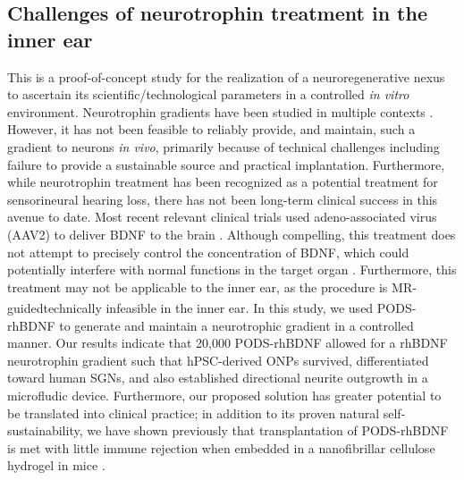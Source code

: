 \documentclass[review]{elsarticle}
\begin{document}
\subsection{Challenges of neurotrophin treatment in the inner ear}  
This is a proof-of-concept study for the realization of a neuroregenerative nexus to ascertain its scientific/technological parameters in a controlled \textit{in vitro} environment. Neurotrophin gradients have been studied in multiple contexts \cite{Keefe2017,Awad2015,Hollis2011}. However, it has not been feasible to reliably provide, and maintain, such a gradient to neurons \textit{in vivo}, primarily because of technical challenges including failure to provide a sustainable source and practical implantation. Furthermore, while neurotrophin treatment has been recognized as a potential treatment for sensorineural hearing loss, there has not been long-term clinical success in this avenue to date. Most recent relevant clinical trials used adeno-associated virus (AAV2) to deliver BDNF to the brain \cite{Nagahara2018}. Although compelling, this treatment does not attempt to precisely control the concentration of BDNF, which could potentially interfere with normal functions in the target organ \cite{Croll1999}. Furthermore, this treatment may not be applicable to the inner ear, as the procedure is MR-guided\textendash technically infeasible in the inner ear. In this study, we used PODS\textsuperscript{\textregistered}-rhBDNF to generate and maintain a neurotrophic gradient in a controlled manner. Our results indicate that 20,000 PODS-rhBDNF allowed for a rhBDNF neurotrophin gradient such that hPSC-derived ONPs survived, differentiated toward human SGNs, and also established directional neurite outgrowth in a microfludic device. Furthermore, our proposed solution has greater potential to be translated into clinical practice; in addition to its proven natural self-sustainability, we have shown previously that transplantation of PODS-rhBDNF is met with little immune rejection when embedded in a nanofibrillar cellulose hydrogel in mice \cite{Chang2020}.
\end{document}
